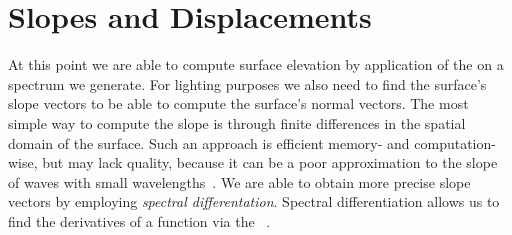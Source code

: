 \section{Slopes and Displacements}
\label{sec:slopes_and_displacements}
At this point we are able to compute surface elevation by application of the
\InvDiscreteFourierTransform on a spectrum we generate. For lighting
purposes we also need to find the surface's slope vectors to be able to compute
the surface's normal vectors. The most simple way to compute the slope is
through finite differences in the spatial domain of the surface. Such an
approach is efficient memory- and computation-wise, but may lack quality,
because it can be a poor approximation to the slope of waves with small
wavelengths~\citep{course:simulatingocean}. We are able to obtain more precise
slope vectors by employing \emph{spectral differentation}. Spectral
differentiation allows us to find the derivatives of a function via the
\FourierTransform~\citep{Trefethen:2000}.

